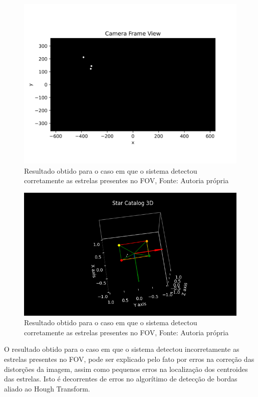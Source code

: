 \begin{figure}[H]
    \centering
    \includegraphics[width=1\textwidth]{images/acertou_2D.png}
    \caption{Resultado obtido para o caso em que o sistema detectou corretamente as estrelas presentes no FOV, Fonte: Autoria própria}
    \label{fig:acertou_2D}
\end{figure}

\begin{figure}[H]
    \centering
    \includegraphics[width=1\textwidth]{images/acertou_3D.png}
    \caption{Resultado obtido para o caso em que o sistema detectou corretamente as estrelas presentes no FOV, Fonte: Autoria própria}
    \label{fig:acertou_3D}
\end{figure}

O resultado obtido para o caso em que o sistema detectou incorretamente as estrelas presentes no FOV,
pode ser explicado pelo fato por erros na correção das distorções da imagem,
assim como pequenos erros na localização dos centroides das estrelas.
Isto é decorrentes de erros no algorítimo de detecção de bordas aliado ao Hough Transform.

